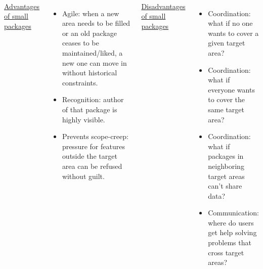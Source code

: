 \documentclass[aspectratio=169]{beamer}
\begin{document}
\begin{frame}{\mbox{ }}
\begin{columns}[t]
\underline{\large Advantages of small packages}

\vspace{0.2 cm}
\begin{itemize}
\item<2-> Agile: when a new area needs to be filled or an old package ceases to be maintained/liked, a new one can move in without historical constraints.

\item<3-> Recognition: author of that package is highly visible.

\item<4-> Prevents scope-creep: pressure for features outside the target area can be refused without guilt.

\end{itemize}

\underline{\large Disadvantages of small packages}

\vspace{0.2 cm}
\begin{itemize}
\item<5-> Coordination: what if no one wants to cover a given target area?

\item<6-> Coordination: what if everyone wants to cover the same target area?

\item<7-> Coordination: what if packages in neighboring target areas can't share data?

\item<8-> Communication: where do users get help solving problems that cross target areas?
\end{itemize}

\end{columns}
\end{frame}
\end{document}
